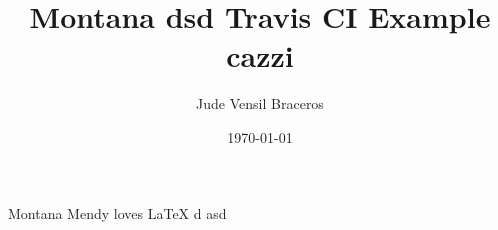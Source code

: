 \documentclass{article}
\title{Montana dsd Travis CI Example cazzi}
\author{Jude Vensil Braceros}
\date{\today}
\begin{document}
\maketitle

Montana Mendy loves LaTeX d asd
\end{document}
